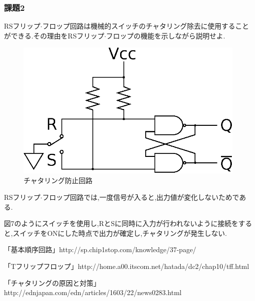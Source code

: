 \documentclass[uplatex]{jsarticle}
\begin{document}
    \subsubsection*{課題2}
        RSフリップ$\cdot$フロップ回路は機械的スイッチのチャタリング除去に使用することができる.その理由をRSフリップ$\cdot$フロップの機能を示しながら説明せよ.\par
        \begin{figure}[h]
            \begin{center}
                \includegraphics{chattering.eps}
                \caption{チャタリング防止回路}
            \end{center}
        \end{figure}
        RSフリップ$\cdot$フロップ回路では,一度信号が入ると,出力値が変化しないためである.\par
        図7のようにスイッチを使用し,RとSに同時に入力が行われないように接続をすると,スイッチをONにした時点で出力が確定し,チャタリングが発生しない.
    \begin{thebibliography}{9}
        \item「基本順序回路」http://sp.chip1stop.com/knowledge/37-page/
        \item「Tフリップフロップ」http://home.a00.itscom.net/hatada/dc2/chap10/tff.html
        \item「チャタリングの原因と対策」http://ednjapan.com/edn/articles/1603/22/news0283.html
    \end{thebibliography}
\end{document}
